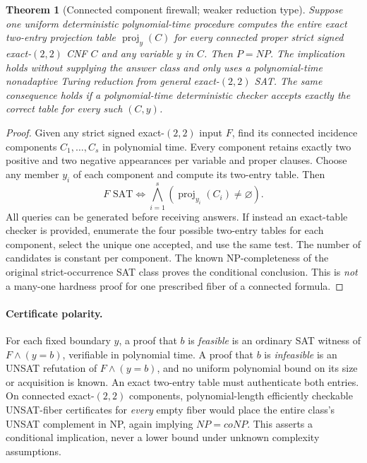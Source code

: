 \documentclass[11pt]{article}
\newtheorem{theorem}{Theorem}
\newcommand{\proj}{\operatorname{proj}}
\begin{document}
\begin{theorem}[Connected component firewall; weaker reduction type]\label{thm:connected}
Suppose one uniform deterministic polynomial-time procedure computes the entire exact two-entry projection table \(\proj_y(C)\) for every \emph{connected} proper strict signed exact-$(2,2)$ CNF $C$ and any variable $y$ in $C$. Then $P=NP$. The implication holds without supplying the answer class and only uses a polynomial-time \emph{nonadaptive Turing reduction} from general exact-$(2,2)$ SAT. The same consequence holds if a polynomial-time deterministic checker accepts exactly the correct table for every such $(C,y)$.
\end{theorem}
\begin{proof}
Given any strict signed exact-$(2,2)$ input $F$, find its connected incidence components $C_1,\ldots,C_s$ in polynomial time. Every component retains exactly two positive and two negative appearances per variable and proper clauses. Choose any member $y_i$ of each component and compute its two-entry table. Then
\[F\text{ SAT}\iff\bigwedge_{i=1}^s(\proj_{y_i}(C_i)\ne\varnothing).\]
All queries can be generated before receiving answers. If instead an exact-table checker is provided, enumerate the four possible two-entry tables for each component, select the unique one accepted, and use the same test. The number of candidates is constant per component. The known NP-completeness of the original strict-occurrence SAT class proves the conditional conclusion. This is \emph{not} a many-one hardness proof for one prescribed fiber of a connected formula.
\end{proof}

\paragraph{Certificate polarity.} For each fixed boundary $y$, a proof that $b$ is \emph{feasible} is an ordinary SAT witness of $F\wedge(y=b)$, verifiable in polynomial time. A proof that $b$ is \emph{infeasible} is an UNSAT refutation of $F\wedge(y=b)$, and no uniform polynomial bound on its size or acquisition is known. An exact two-entry table must authenticate both entries. On connected exact-$(2,2)$ components, polynomial-length efficiently checkable UNSAT-fiber certificates for \emph{every} empty fiber would place the entire class's UNSAT complement in NP, again implying $NP=coNP$. This asserts a conditional implication, never a lower bound under unknown complexity assumptions.
\end{document}
